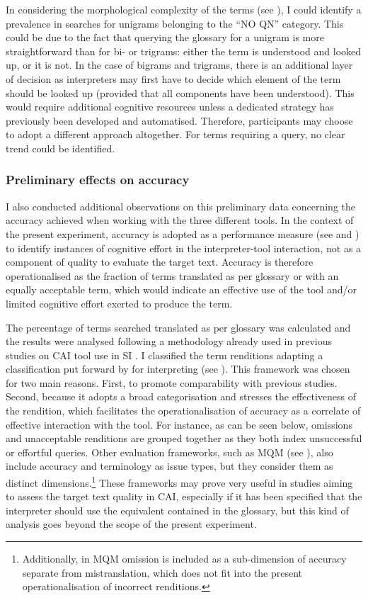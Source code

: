 In considering the morphological complexity of the terms (see ), I could identify a prevalence in searches for unigrams belonging to the ``NO QN'' category. This could be due to the fact that querying the glossary for a unigram is more straightforward than for bi- or trigrams: either the term is understood and looked up, or it is not. In the case of bigrams and trigrams, there is an additional layer of decision as interpreters may first have to decide which element of the term should be looked up (provided that all components have been understood). This would require additional cognitive resources unless a dedicated strategy has previously been developed and automatised. Therefore, participants may choose to adopt a different approach altogether. For terms requiring a query, no clear trend could be identified.


\subsubsection{Preliminary effects on accuracy} \label{accuracyPS}
I also conducted additional observations on this preliminary data concerning the accuracy achieved when working with the three different tools. In the context of the present experiment, accuracy is adopted as a performance measure (see  and ) to identify instances of cognitive effort in the interpreter-tool interaction, not as a component of quality to evaluate the target text. Accuracy is therefore operationalised as the fraction of terms translated as per glossary or with an equally acceptable term, which would indicate an effective use of the tool and/or limited cognitive effort exerted to produce the term.

The percentage of terms searched translated as per glossary was calculated and the results were analysed following a methodology already used in previous studies on CAI tool use in SI \citep{prandi_uso_2015,prandi_use_2015,biagini_glossario_2015}. I classified the term renditions adapting a classification put forward by \citet{wadensjo_interpreting_1998} for interpreting (see ). This framework was chosen for two main reasons. First, to promote comparability with previous studies. Second, because it adopts a broad categorisation and stresses the effectiveness of the rendition, which facilitates the operationalisation of accuracy as a correlate of effective interaction with the tool. For instance, as can be seen below, omissions and unacceptable renditions are grouped together as they both index unsuccessful or effortful queries. Other evaluation frameworks, such as MQM (see ), also include accuracy and terminology as issue types, but they consider them as distinct dimensions.\footnote{Additionally, in MQM omission is included as a sub-dimension of accuracy separate from mistranslation, which does not fit into the present operationalisation of incorrect renditions.} These frameworks may prove very useful in studies aiming to assess the target text quality in CAI, especially if it has been specified that the interpreter should use the equivalent contained in the glossary, but this kind of analysis goes beyond the scope of the present experiment.

